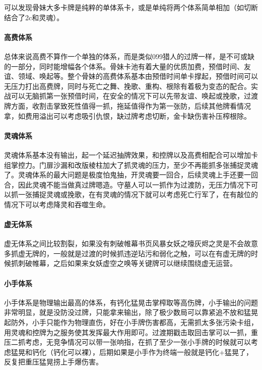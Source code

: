 \documentclass[12pt, a4paper]{article}
\begin{document}
可以发现骨妹大多卡牌是纯粹的单体系卡，或是单纯将两个体系简单相加（如切断结合了2c和灵魂）。

\paragraph{高费体系}
总体来说高费不算作一个单独的体系，而是类似099猎人的过牌一样，是不可或缺的一部分，同时能增幅各个体系。骨妹卡池有着大量的优质加费，预借时间、友谊、领域、唤起等。整个骨妹的高费体系基本由预借时间单卡撑起，预借时间可以无压力打出高费牌，同时与死亡之舞、挽歌、重构、根除有着极为变态的配合。实战可以无脑抓第一张预借时间，在安全的情况下可以先带友谊、唤起或挽歌，过渡牌方面，收割击掌致死性值得一抓，拖延值得作为第一张防，后续其他牌看情况拿，如费用溢出可以考虑吸引仇恨，缺过牌考虑切断，金卡缺伤害补压榨根除。

\paragraph{灵魂体系}
灵魂体系基本没有输出，起一个延迟抽牌效果，和控牌以及高费相配合可以增加卡组掌控力。门扉沙漏和改版棱柱加大了抓灵魂的压力，至少不再能抓多张捕捉灵魂了。灵魂体系的最大问题是极度怕鬼抽，开灵魂要一回合，后续灵魂上手还要一回合，因此灵魂不能当做真过牌嗯造。守墓人可以一抓作为过渡防，无压力情况下可以抓一张捕捉灵魂或挽歌，在有灵魂的情况下就可以考虑死亡行军了，在有敲位的情况下可以考虑降灵和吞噬生命。

\paragraph{虚无体系}
虚无体系之间比较割裂，如果没有刺破帷幕书页风暴女妖之嚎灰烬之灵是不会故意多抓虚无牌的，一般就是过渡的时候抓违逆玷污和弱化之触，可以在有虚无牌的时候抓刺破帷幕，之后如果来女妖虚空之唤等关键牌可以继续围绕虚无运营。

\paragraph{小手体系}
小手体系是物理输出最高的体系，有钙化猛晃击掌榨取等高伤牌，小手输出的问题非常明显，就是没防没过牌，只能拿来输出，除了极少数局可以靠紧追不放和猛晃起防外，小手只能作为物理直伤，好在小手牌伤害都高，无需抓太多张污染卡组，用灵魂和控牌为之服务使其发挥最大作用即可。过渡期戳击取回击掌可以一抓，重压二抓考虑，无竞争情况可以带一张响指，在抓了至少一张小手牌的时候就可以考虑猛晃和钙化（钙化可以裸），后期如果是小手作为终端一般就是钙化+猛晃了，反复把重压猛晃捞上手爆伤害。
\end{document}
